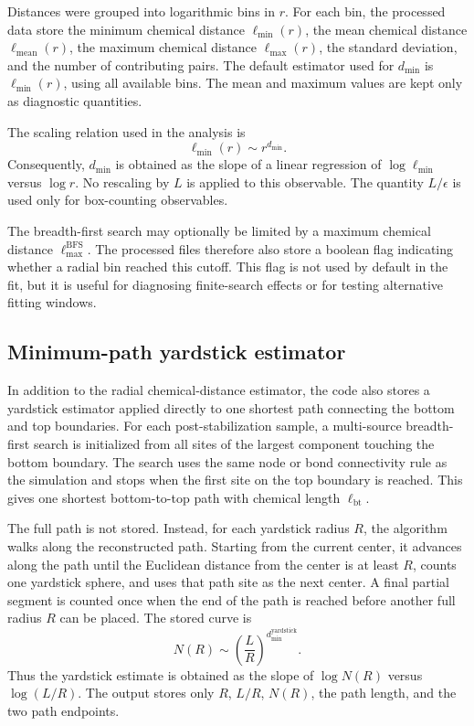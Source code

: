 Distances were grouped into logarithmic bins in \(r\).  For each bin, the
processed data store the minimum chemical distance
\(\ell_{\min}(r)\), the mean chemical distance \(\ell_{\mathrm{mean}}(r)\),
the maximum chemical distance \(\ell_{\max}(r)\), the standard deviation, and
the number of contributing pairs.  The default estimator used for
\(d_{\min}\) is \(\ell_{\min}(r)\), using all available bins.  The mean and
maximum values are kept only as diagnostic quantities.

The scaling relation used in the analysis is
\begin{equation}
    \ell_{\min}(r) \sim r^{d_{\min}}.
    \label{eq:dmin-chemical-distance}
\end{equation}
Consequently, \(d_{\min}\) is obtained as the slope of a linear regression of
\(\log \ell_{\min}\) versus \(\log r\).  No rescaling by \(L\) is applied to
this observable.  The quantity \(L/\epsilon\) is used only for box-counting
observables.

The breadth-first search may optionally be limited by a maximum chemical
distance \(\ell_{\max}^{\mathrm{BFS}}\).  The processed files therefore also
store a boolean flag indicating whether a radial bin reached this cutoff.  This
flag is not used by default in the fit, but it is useful for diagnosing
finite-search effects or for testing alternative fitting windows.

\subsection{Minimum-path yardstick estimator}
\label{subsec:minimum-path-yardstick}

In addition to the radial chemical-distance estimator, the code also stores a
yardstick estimator applied directly to one shortest path connecting the bottom
and top boundaries.  For each post-stabilization sample, a multi-source
breadth-first search is initialized from all sites of the largest component
touching the bottom boundary.  The search uses the same node or bond
connectivity rule as the simulation and stops when the first site on the top
boundary is reached.  This gives one shortest bottom-to-top path with chemical
length \(\ell_{\mathrm{bt}}\).

The full path is not stored.  Instead, for each yardstick radius \(R\), the
algorithm walks along the reconstructed path.  Starting from the current center,
it advances along the path until the Euclidean distance from the center is at
least \(R\), counts one yardstick sphere, and uses that path site as the next
center.  A final partial segment is counted once when the end of the path is
reached before another full radius \(R\) can be placed.  The stored curve is
\begin{equation}
    N(R) \sim \left(\frac{L}{R}\right)^{d_{\min}^{\mathrm{yardstick}}}.
    \label{eq:dmin-yardstick}
\end{equation}
Thus the yardstick estimate is obtained as the slope of
\(\log N(R)\) versus \(\log(L/R)\).  The output stores only \(R\), \(L/R\),
\(N(R)\), the path length, and the two path endpoints.

